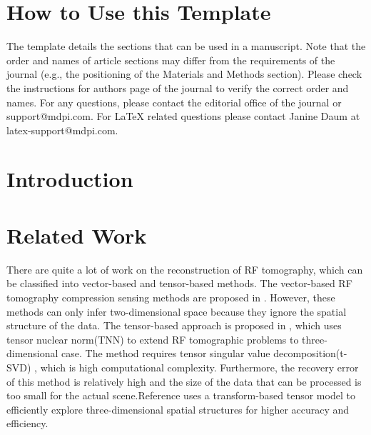 \documentclass[journal,article,submit,moreauthors,pdftex,10pt,a4paper]{Definitions/mdpi}
\theoremstyle{plain}
\theoremstyle{definition}
\theoremstyle{remark}
\begin{document}

\setcounter{section}{-1} %
\section{How to Use this Template}
The template details the sections that can be used in a manuscript. Note that the order and names of article sections may differ from the requirements of the journal (e.g., the positioning of the Materials and Methods section). Please check the instructions for authors page of the journal to verify the correct order and names. For any questions, please contact the editorial office of the journal or support@mdpi.com. For LaTeX related questions please contact Janine Daum at latex-support@mdpi.com.

\section{Introduction}

\section{Related Work}
There are quite a lot of work on the reconstruction of RF tomography, which can be classified into vector-based and tensor-based methods.
The vector-based RF tomography compression sensing methods are proposed in \cite{kanso2009compressed, mostofi2011compressive}. However, these methods can only infer two-dimensional space because they ignore the spatial structure of the data. 
The tensor-based approach is proposed in \cite{matsuda2017multi}, which uses tensor nuclear norm(TNN) \cite{li2013generalized} to extend RF tomographic problems to three-dimensional case. The method requires tensor singular value decomposition(t-SVD) , which is high computational complexity. Furthermore, the recovery error of this method is relatively high and the size of the data that can be processed is too small for the actual scene.Reference \cite{}uses a transform-based tensor model\cite{liu2017fourth} to efficiently explore three-dimensional spatial structures for higher accuracy and efficiency. 
\end{document}

